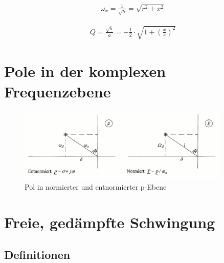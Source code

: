 \documentclass[a4paper, 12pt]{report}
\begin{document}
	\begin{minipage}[t]{0.5\textwidth}
		\begin{align*}
			\omega_x = \frac{1}{\sqrt{b}} = \sqrt{r^2 + x^2}
		\end{align*}
	\end{minipage}
	\begin{minipage}[t]{0.5\textwidth}
		\begin{align*}
			Q = \frac{\sqrt{b}}{a} = - \frac{1}{2} \cdot \sqrt{1 + \left( \frac{x}{r} \right)^2}
		\end{align*}
	\end{minipage}
	
\section*{Pole in der komplexen Frequenzebene}
	
	\begin{figure}[h]
		\centering
		\includegraphics[width=0.9\textwidth]{images/p-ebene.png}
		\caption{Pol in normierter und entnormierter p-Ebene}
	\end{figure}

\clearpage

\section*{Freie, gedämpfte Schwingung}
\subsection*{Definitionen}
    
\end{document}
